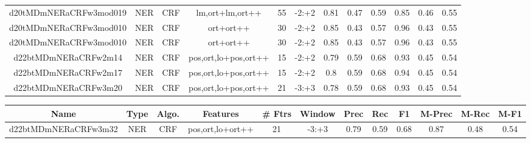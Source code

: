 \documentclass[a4paper]{article}
\begin{document}
\begin{landscape}
\begin{center}
\begin{tabular}{ |c|c|c|c|c|c|c|c|c|c|c|c|}
 
 	
 	\small{ d20tMDmNERaCRFw3mod019 } & \small{ NER} & \small{  CRF }  & lm,ort+lm,ort++  &  55 &  \small{  -2:+2 }  &  0.81 & 0.47 & 0.59  &  0.85 & 0.46 & 0.55 \\
 	

 
 	
 	\small{ d20tMDmNERaCRFw3mod010 } & \small{ NER} & \small{  CRF }  & ort+ort++  &  30 &  \small{  -2:+2 }  &  0.85 & 0.43 & 0.57  &  0.96 & 0.43 & 0.55 \\
 	

 
 	
 	\small{ d20tMDmNERaCRFw3mod010 } & \small{ NER} & \small{  CRF }  & ort+ort++  &  30 &  \small{  -2:+2 }  &  0.85 & 0.43 & 0.57  &  0.96 & 0.43 & 0.55 \\
 	

 
 	
 	\small{ d22btMDmNERaCRFw2m14 } & \small{ NER} & \small{  CRF }  & pos,ort,lo+pos,ort++  &  15 &  \small{  -2:+2 }  &  0.79 & 0.59 & 0.68  &  0.93 & 0.45 & 0.54 \\
 	

 
 	
 	\small{ d22btMDmNERaCRFw2m17 } & \small{ NER} & \small{  CRF }  & pos,ort,lo+pos,ort++  &  15 &  \small{  -2:+2 }  &  0.8 & 0.59 & 0.68  &  0.94 & 0.45 & 0.54 \\
 	

 
 	
 	\small{ d22btMDmNERaCRFw3m20 } & \small{ NER} & \small{  CRF }  & pos,ort,lo+pos,ort++  &  21 &  \small{  -3:+3 }  &  0.78 & 0.59 & 0.68  &  0.93 & 0.45 & 0.54 \\
 	
 \hline
\end{tabular}
\end{center}




\begin{center}
\begin{tabular}{ |c|c|c|c|c|c|c|c|c|c|c|c|} 
 \hline
 	Name & Type & Algo. & Features & \# Ftrs & Window & Prec & Rec & F1 & M-Prec & M-Rec & M-F1\\
 \hline

 	

 
 	
 	\small{ d22btMDmNERaCRFw3m32 } & \small{ NER} & \small{  CRF }  & pos,ort,lo+ort++  &  21 &  \small{  -3:+3 }  &  0.79 & 0.59 & 0.68  &  0.87 & 0.48 & 0.54 \\
 	


\end{tabular}
\end{center}
\end{landscape}
\end{document}
